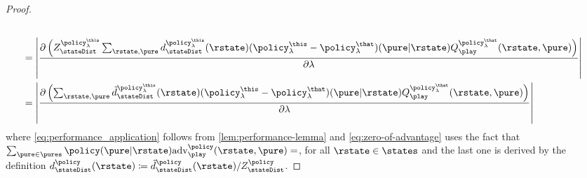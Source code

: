 \begin{proof}
\begin{subequations}
\begin{align}
	\label{eq:zero-of-advantage}\\
	&= \abs*{\frac{\pd\left(\normConst{\stateDist}{\policy_{\lambda}^{\this}}
  \sum_{\rstate,\pure}\visitDistr{\stateDist}{\policy_{\lambda}^{\this}}(\rstate)(\policy_{\lambda}^{\this}-\policy_{\lambda}^{\that})(\pure \vert \rstate)Q_{\play}^{\policy_{\lambda}^{\that}}(\rstate,\pure)
	\right)}{\pd \lambda}}
	\notag\\
	&= \abs*{\frac{\pd\left(
  \sum_{\rstate,\pure}\visitMeas{\stateDist}{\policy_{\lambda}^{\this}}(\rstate)(\policy_{\lambda}^{\this}-\policy_{\lambda}^{\that})(\pure \vert \rstate)Q_{\play}^{\policy_{\lambda}^{\that}}(\rstate,\pure)
	\right)}{\pd \lambda}}
\end{align}
\end{subequations}
where \eqref{eq:performance_application} follows from \cref{lem:performance-lemma} and \eqref{eq:zero-of-advantage} uses the fact that $\sum_{\pure\in\pures}\policy(\pure\vert\rstate)\adv_{\play}^{\policy}(\rstate,\pure)=$, for all $\rstate\in\states$ and the last one is derived by the definition $\visitDistr{\stateDist}{\policy}\parens{\rstate} \defeq \visitMeas{\stateDist}{\policy}\parens{\rstate}/\normConst{\stateDist}{\policy}$.


\end{proof}

